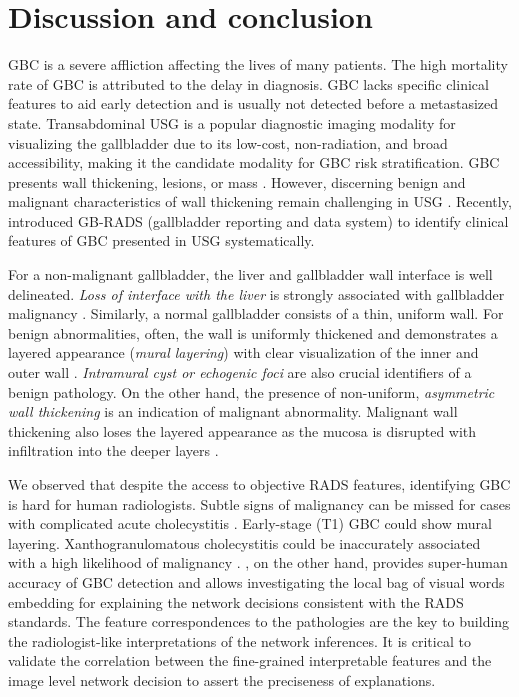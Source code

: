 \section{Discussion and conclusion}
\label{radformer:disc_conc}
%
GBC is a severe affliction affecting the lives of many patients. The high mortality rate of GBC is attributed to the delay in diagnosis. GBC lacks specific clinical features to aid early detection and is usually not detected before a metastasized state. Transabdominal USG is a popular diagnostic imaging modality for visualizing the gallbladder due to its low-cost, non-radiation, and broad accessibility, making it the candidate modality for GBC risk stratification. GBC presents wall thickening, lesions, or mass \cite{lopes2021gallbladder}. However, discerning benign and malignant characteristics of wall thickening remain challenging in USG \cite{gupta2020evaluation}. Recently, \cite{gb-rads-paper} introduced GB-RADS (gallbladder reporting and data system) to identify clinical features of GBC presented in USG systematically. 
%
\par For a non-malignant gallbladder, the liver and gallbladder wall interface is well delineated. \emph{Loss of interface with the liver} is strongly associated with gallbladder malignancy \cite{catalano2008mr}. Similarly, a normal gallbladder consists of a thin, uniform wall. For benign abnormalities, often, the wall is uniformly thickened and demonstrates a layered appearance (\emph{mural layering}) with clear visualization of the inner and outer wall \cite{mizuguchi1997endoscopic}. \emph{Intramural cyst or echogenic foci} are also crucial identifiers of a benign pathology.
On the other hand, the presence of non-uniform, \emph{asymmetric wall thickening} is an indication of malignant abnormality. Malignant wall thickening also loses the layered appearance as the mucosa is disrupted with infiltration into the deeper layers \cite{joo2013differentiation}. 
%
\par We observed that despite the access to objective RADS features, identifying GBC is hard for human radiologists. Subtle signs of malignancy can be missed for cases with complicated acute cholecystitis \cite{liu2012contrast}. Early-stage (T1) GBC could show mural layering. Xanthogranulomatous cholecystitis could be inaccurately associated with a high likelihood of malignancy \cite{deng2015xanthogranulomatous, zhang2019usefulness}. \radformer, on the other hand, provides super-human accuracy of GBC detection and allows investigating the local bag of visual words embedding for explaining the network decisions consistent with the RADS standards. The feature correspondences to the pathologies are the key to building the radiologist-like interpretations of the network inferences. It is critical to validate the correlation between the fine-grained interpretable features and the image level network decision to assert the preciseness of \radformer explanations. 
